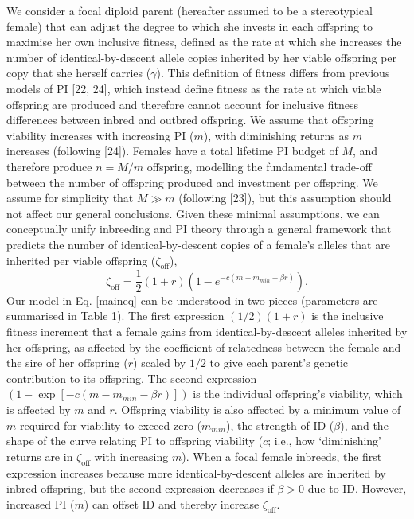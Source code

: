 \documentclass[12pt]{article}
\begin{document}
We consider a focal diploid parent (hereafter assumed to be a stereotypical female) that can adjust the degree to which she invests in each offspring to maximise her own inclusive fitness, defined as the rate at which she increases the number of identical-by-descent allele copies inherited by her viable offspring per copy that she herself carries ($\gamma$). This definition of fitness differs from previous models of PI [22, 24], which instead define fitness as the rate at which viable offspring are produced and therefore cannot account for inclusive fitness differences between inbred and outbred offspring. We assume that offspring viability increases with increasing PI ($m$), with diminishing returns as $m$ increases (following [24]). Females have a total lifetime PI budget of $M$, and therefore produce $n=M/m$ offspring, modelling the fundamental trade-off between the number of offspring produced and investment per offspring. We assume for simplicity that $M \gg m$ (following [23]), but this assumption should not affect our general conclusions. Given these minimal assumptions, we can conceptually unify inbreeding and PI theory through a general framework that predicts the number of identical-by-descent copies of a female's alleles that are inherited per viable offspring ($\zeta_{\textrm{off}}$),
\begin{equation} \label{maineq}
\zeta_{\textrm{off}} = \frac{1}{2}\left(1+r\right)\left(1-e^{-c\left(m-m_{min}-\beta r\right)}\right).
\end{equation}
Our model in Eq. \ref{maineq} can be understood in two pieces (parameters are summarised in Table 1). The first expression $\left(1/2\right) \left(1 + r\right)$ is the inclusive fitness increment that a female gains from identical-by-descent alleles inherited by her offspring, as affected by the coefficient of relatedness between the female and the sire of her offspring ($r$) scaled by $1/2$ to give each parent's genetic contribution to its offspring. The second expression $\left(1 - \exp\left[-c\left(m-m_{min}-\beta r\right)\right]\right)$ is the individual offspring's viability, which is affected by $m$ and $r$. Offspring viability is also affected by a minimum value of $m$ required for viability to exceed zero ($m_{min}$), the strength of ID ($\beta$), and the shape of the curve relating PI to offspring viability ($c$; i.e., how `diminishing' returns are in $\zeta_{\textrm{off}}$ with increasing $m$). When a focal female inbreeds, the first expression increases because more identical-by-descent alleles are inherited by inbred offspring, but the second expression decreases if $\beta>0$ due to ID. However, increased PI ($m$) can offset ID and thereby increase $\zeta_{\textrm{off}}$. 
\end{document}

